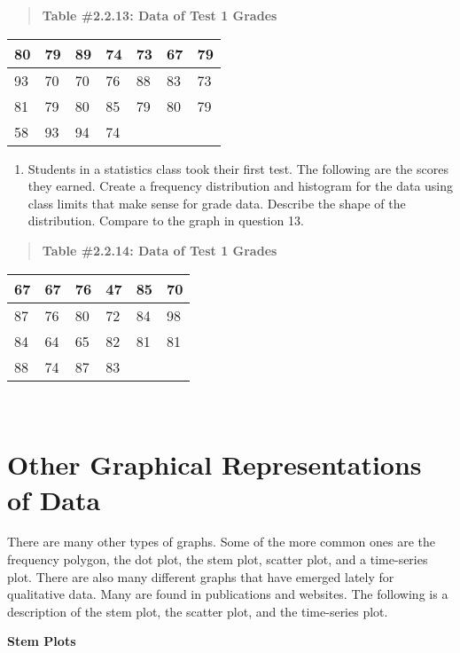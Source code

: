 \documentclass[]{book}
\providecommand{\tightlist}{%
  \setlength{\itemsep}{0pt}\setlength{\parskip}{0pt}}
\begin{document}
\begin{quote}
\textbf{Table \#2.2.13: Data of Test 1 Grades}
\end{quote}

\begin{longtable}[]{@{}lllllll@{}}
\toprule
80 & 79 & 89 & 74 & 73 & 67 & 79\tabularnewline
\midrule
\endhead
93 & 70 & 70 & 76 & 88 & 83 & 73\tabularnewline
81 & 79 & 80 & 85 & 79 & 80 & 79\tabularnewline
58 & 93 & 94 & 74 & & &\tabularnewline
\bottomrule
\end{longtable}

\begin{enumerate}
\def\labelenumi{\arabic{enumi}.}
\setcounter{enumi}{13}
\tightlist
\item
  Students in a statistics class took their first test. The following
  are the scores they earned. Create a frequency distribution and
  histogram for the data using class limits that make sense for grade
  data. Describe the shape of the distribution. Compare to the graph
  in question 13.
\end{enumerate}

\begin{quote}
\textbf{Table \#2.2.14: Data of Test 1 Grades}
\end{quote}

\begin{longtable}[]{@{}llllll@{}}
\toprule
67 & 67 & 76 & 47 & 85 & 70\tabularnewline
\midrule
\endhead
87 & 76 & 80 & 72 & 84 & 98\tabularnewline
84 & 64 & 65 & 82 & 81 & 81\tabularnewline
88 & 74 & 87 & 83 & &\tabularnewline
\bottomrule
\end{longtable}

\textbf{\\
}

\hypertarget{other-graphical-representations-of-data}{%
\section{Other Graphical Representations of Data}\label{other-graphical-representations-of-data}}

There are many other types of graphs. Some of the more common ones are the frequency polygon, the dot plot, the stem plot, scatter plot, and a time-series plot. There are also many different graphs that have emerged lately for qualitative data. Many are found in publications and websites. The following is a description of the stem plot, the scatter plot, and the time-series plot.

\textbf{Stem Plots}
\end{document}
